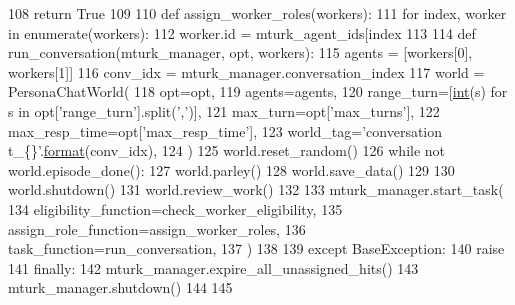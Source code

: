 \begin{DoxyCode}
108             \textcolor{keywordflow}{return} \textcolor{keyword}{True}
109 
110         \textcolor{keyword}{def }assign\_worker\_roles(workers):
111             \textcolor{keywordflow}{for} index, worker \textcolor{keywordflow}{in} enumerate(workers):
112                 worker.id = mturk\_agent\_ids[index %
113 
114         \textcolor{keyword}{def }run\_conversation(mturk\_manager, opt, workers):
115             agents = [workers[0], workers[1]]
116             conv\_idx = mturk\_manager.conversation\_index
117             world = PersonaChatWorld(
118                 opt=opt,
119                 agents=agents,
120                 range\_turn=[\hyperlink{namespaceprojects_1_1mastering__the__dungeon_1_1mturk_1_1tasks_1_1MTD_1_1run_a693eb03afbb820bbfe8b47b12e69e519}{int}(s) \textcolor{keywordflow}{for} s \textcolor{keywordflow}{in} opt[\textcolor{stringliteral}{'range\_turn'}].split(\textcolor{stringliteral}{','})],
121                 max\_turn=opt[\textcolor{stringliteral}{'max\_turns'}],
122                 max\_resp\_time=opt[\textcolor{stringliteral}{'max\_resp\_time'}],
123                 world\_tag=\textcolor{stringliteral}{'conversation t\_\{\}'}.\hyperlink{namespaceparlai_1_1chat__service_1_1services_1_1messenger_1_1shared__utils_a32e2e2022b824fbaf80c747160b52a76}{format}(conv\_idx),
124             )
125             world.reset\_random()
126             \textcolor{keywordflow}{while} \textcolor{keywordflow}{not} world.episode\_done():
127                 world.parley()
128             world.save\_data()
129 
130             world.shutdown()
131             world.review\_work()
132 
133         mturk\_manager.start\_task(
134             eligibility\_function=check\_worker\_eligibility,
135             assign\_role\_function=assign\_worker\_roles,
136             task\_function=run\_conversation,
137         )
138 
139     \textcolor{keywordflow}{except} BaseException:
140         \textcolor{keywordflow}{raise}
141     \textcolor{keywordflow}{finally}:
142         mturk\_manager.expire\_all\_unassigned\_hits()
143         mturk\_manager.shutdown()
144 
145 
\end{DoxyCode}
